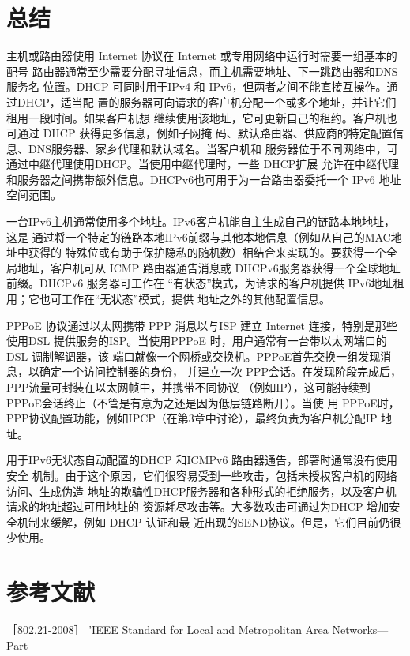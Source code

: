 \section{总结}

主机或路由器使用 Internet 协议在 Internet 或专用网络中运行时需要一组基本的配号
路由器通常至少需要分配寻址信息，而主机需要地址、下一跳路由器和DNS服务名
位置。DHCP 可同时用于IPv4 和 IPv6，但两者之间不能直接互操作。通过DHCP，适当配
置的服务器可向请求的客户机分配一个或多个地址，并让它们租用一段时间。如果客户机想
继续使用该地址，它可更新自己的租约。客户机也可通过 DHCP 获得更多信息，例如子网掩
码、默认路由器、供应商的特定配置信息、DNS服务器、家乡代理和默认域名。当客户机和
服务器位于不同网络中，可通过中继代理使用DHCP。当使用中继代理时，一些 DHCP扩展
允许在中继代理和服务器之间携带额外信息。DHCPv6也可用于为一台路由器委托一个 IPv6
地址空间范围。

一台IPv6主机通常使用多个地址。IPv6客户机能自主生成自己的链路本地地址，这是
通过将一个特定的链路本地IPv6前缀与其他本地信息（例如从自己的MAC地址中获得的
特殊位或有助于保护隐私的随机数）相结合来实现的。要获得一个全局地址，客户机可从
ICMP 路由器通告消息或 DHCPv6服务器获得一个全球地址前缀。DHCPv6 服务器可工作在
“有状态”模式，为请求的客户机提供 IPv6地址租用；它也可工作在“无状态”模式，提供
地址之外的其他配置信息。

PPPoE 协议通过以太网携带 PPP 消息以与ISP 建立 Internet 连接，特别是那些使用DSL
提供服务的ISP。当使用PPPoE 时，用户通常有一台带以太网端口的DSL 调制解调器，该
端口就像一个网桥或交换机。PPPoE首先交换一组发现消息，以确定一个访问控制器的身份，
并建立一次 PPP会话。在发现阶段完成后，PPP流量可封装在以太网帧中，并携带不同协议
（例如IP），这可能持续到 PPPoE会话终止（不管是有意为之还是因为低层链路断开）。当使
用 PPPoE时，PPP协议配置功能，例如IPCP（在第3章中讨论），最终负责为客户机分配IP
地址。

用于IPv6无状态自动配置的DHCP 和ICMPv6 路由器通告，部署时通常没有使用安全
机制。由于这个原因，它们很容易受到一些攻击，包括未授权客户机的网络访问、生成伪造
地址的欺骗性DHCP服务器和各种形式的拒绝服务，以及客户机请求的地址超过可用地址的
资源耗尽攻击等。大多数攻击可通过为DHCP 增加安全机制来缓解，例如 DHCP 认证和最
近出现的SEND协议。但是，它们目前仍很少使用。

\section{参考文献}

［802.21-2008］ 'IEEE Standard for Local and Metropolitan Area Networks—Part

